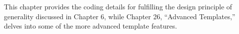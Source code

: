 This chapter provides the coding details for fulfilling the design principle of generality discussed in Chapter 6, while Chapter 26, “Advanced Templates,” delves into some of the more advanced template features.


















